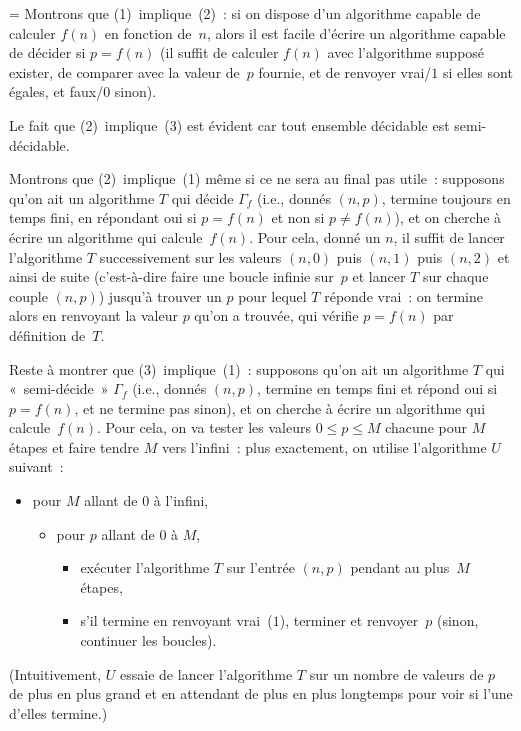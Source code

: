 \documentclass[12pt,a4paper]{article}
\theoremstyle{definition}
\newif\ifcorrige
\newenvironment{corrige}%
{\ifcorrige\relax\else\setbox0=\vbox\bgroup\fi%
\smallbreak\footnotesize\noindent{\underbar{\textit{Corrigé.}}\quad}}
{{\hbox{}\nobreak\hfill\checkmark}%
\ifcorrige\relax\else\egroup\fi\par}
\begin{document}
\begin{corrige}
Montrons que (1) implique (2) : si on dispose d'un algorithme capable
de calculer $f(n)$ en fonction de $n$, alors il est facile d'écrire un
algorithme capable de décider si $p=f(n)$ (il suffit de calculer
$f(n)$ avec l'algorithme supposé exister, de comparer avec la valeur
de $p$ fournie, et de renvoyer vrai/$1$ si elles sont égales, et
faux/$0$ sinon).

Le fait que (2) implique (3) est évident car tout ensemble décidable
est semi-décidable.

Montrons que (2) implique (1) même si ce ne sera au final pas utile :
supposons qu'on ait un algorithme $T$ qui décide $\Gamma_f$ (i.e.,
donnés $(n,p)$, termine toujours en temps fini, en répondant oui si
$p=f(n)$ et non si $p\neq f(n)$), et on cherche à écrire un algorithme
qui calcule $f(n)$.  Pour cela, donné un $n$, il suffit de lancer
l'algorithme $T$ successivement sur les valeurs $(n,0)$ puis $(n,1)$
puis $(n,2)$ et ainsi de suite (c'est-à-dire faire une boucle infinie
sur $p$ et lancer $T$ sur chaque couple $(n,p)$) jusqu'à trouver un
$p$ pour lequel $T$ réponde vrai : on termine alors en renvoyant la
valeur $p$ qu'on a trouvée, qui vérifie $p=f(n)$ par définition
de $T$.

\smallbreak

Reste à montrer que (3) implique (1) : supposons qu'on ait un
algorithme $T$ qui « semi-décide » $\Gamma_f$ (i.e., donnés $(n,p)$,
termine en temps fini et répond oui si $p=f(n)$, et ne termine pas
sinon), et on cherche à écrire un algorithme qui calcule $f(n)$.  Pour
cela, on va tester les valeurs $0\leq p\leq M$ chacune pour $M$ étapes
et faire tendre $M$ vers l'infini : plus exactement, on utilise
l'algorithme $U$ suivant :
\begin{itemize}
\item pour $M$ allant de $0$ à l'infini,
\begin{itemize}
\item pour $p$ allant de $0$ à $M$,
\begin{itemize}
\item exécuter l'algorithme $T$ sur l'entrée $(n,p)$ pendant au
  plus $M$ étapes,
\item s'il termine en renvoyant vrai ($1$), terminer et renvoyer $p$
  (sinon, continuer les boucles).
\end{itemize}
\end{itemize}
\end{itemize}

(Intuitivement, $U$ essaie de lancer l'algorithme $T$ sur un nombre de
valeurs de $p$ de plus en plus grand et en attendant de plus en plus
longtemps pour voir si l'une d'elles termine.)


\end{corrige}
\end{document}
